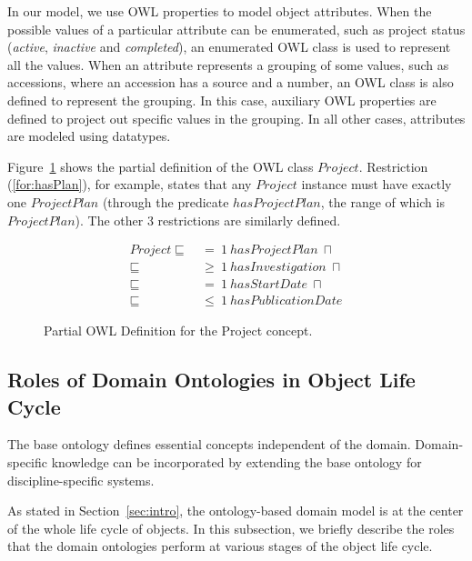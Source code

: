\documentclass{llncs}
\begin{document}
\vspace{-12pt}
In our model, we use OWL properties to model object attributes. When
the possible values of a particular attribute can be enumerated, such
as project status (\emph{active}, \emph{inactive} and
\emph{completed}), an enumerated OWL class is used to represent all the
values. When an attribute represents a grouping of some values, such as
accessions, where an accession has a source and a number, an OWL class
is also defined to represent the grouping. In this case, auxiliary OWL
properties are defined to project out specific values in the grouping.
In all other cases, attributes are modeled using datatypes.

Figure~\ref{fig:project_owl} shows the partial definition of the OWL
class $Project$. Restriction (\ref{for:hasPlan}), for example, states
that any $Project$ instance must have exactly one $ProjectPlan$
(through the predicate $hasProjectPlan$, the range of which is
$ProjectPlan$). The other 3 restrictions are similarly defined.

\vspace{-16pt}
\begin{figure}[htb]
\centering \small
\begin{align}
Project \sqsubseteq~ &=~ 1~ hasProjectPlan~ \sqcap \label{for:hasPlan}\\
        \sqsubseteq~ &\geq~ 1~ hasInvestigation~ \sqcap \\
        \sqsubseteq~ &=~ 1~ hasStartDate~ \sqcap\\
        \sqsubseteq~ &\leq~ 1~ hasPublicationDate
\end{align}
\vspace{-16pt} \caption{Partial OWL Definition for the Project
concept.}\label{fig:project_owl}
\end{figure}

\vspace{-24pt}
\subsection{Roles of Domain Ontologies in Object Life Cycle}
The base ontology defines essential concepts independent of the domain.
Domain-specific knowledge can be incorporated by extending the base
ontology for discipline-specific systems.

As stated in Section~\ref{sec:intro}, the ontology-based domain model
is at the center of the whole life cycle of objects. In this
subsection, we briefly describe the roles that the domain ontologies
perform at various stages of the object life cycle.
\end{document}
